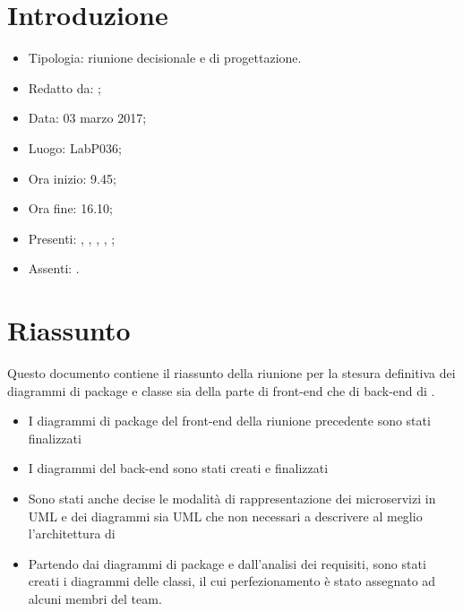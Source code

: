 \section{Introduzione}

	\begin{itemize}
		\item Tipologia: riunione decisionale e di progettazione.
		\item Redatto da: \MC;
		\item Data: 03 marzo 2017;
		\item Luogo: LabP036;
		\item Ora inizio: 9.45;
		\item Ora fine: 16.10;
		\item Presenti: \AN, \AS, \DS, \MC, \NS;
		\item Assenti: \DAN.	
	\end{itemize}

\section{Riassunto}
Questo documento contiene il riassunto della riunione per la stesura definitiva dei diagrammi di package e classe sia della parte di front-end che di back-end di \progetto. 
\begin{itemize}
	\item I diagrammi di package del front-end della riunione precedente sono stati finalizzati
	\item I diagrammi del back-end sono stati creati e finalizzati
	\item Sono stati anche decise le modalità di rappresentazione dei microservizi in UML e dei diagrammi sia UML che non necessari a descrivere al meglio l'architettura di \progetto
	\item Partendo dai diagrammi di package e dall'analisi dei requisiti, sono stati creati i diagrammi delle classi, il cui perfezionamento è stato assegnato ad alcuni membri del team.
	
\end{itemize}

